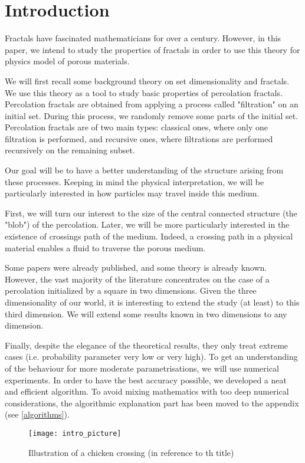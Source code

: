 \setcounter{section}{-1}
\section{Introduction}

Fractals have fascinated mathematicians for over a century.
However, in this paper, we intend to study the properties of fractals in order to use this theory for physics model of porous materials.

We will first recall some background theory on set dimensionality and fractals.
We use this theory as a tool to study basic properties of percolation fractals.
Percolation fractals are obtained from applying a process called "filtration" on an initial set.
During this process, we randomly remove some parts of the initial set.
Percolation fractals are of two main types: classical ones, where only one filtration is performed, and recursive ones, where filtrations are performed recursively on the remaining subset.

Our goal will be to have a better understanding of the structure arising from these processes.
Keeping in mind the physical interpretation, we will be particularly interested in how particles may travel inside this medium.

First, we will turn our interest to the size of the central connected structure (the "blob") of the percolation.
Later, we will be more particularly interested in the existence of crossings path of the medium.
Indeed, a crossing path in a physical material enables a fluid to traverse the porous medium.

Some papers were already published, and some theory is already known.
However, the vast majority of the literature concentrates on the case of a percolation initialized by a square in two dimensions.
Given the three dimensionality of our world, it is interesting to extend the study (at least) to this third dimension.
We will extend some results known in two dimensions to any dimension.

Finally, despite the elegance of the theoretical results, they only treat extreme cases (i.e. probability parameter very low or very high).
To get an understanding of the behaviour for more moderate parametrisations, we will use numerical experiments.
In order to have the best accuracy possible, we developed a neat and efficient algorithm.
To avoid mixing mathematics with too deep numerical considerations, the algorithmic explanation part has been moved to the appendix (see \ref{algorithms}).

\begin{figure}[!h]
	\vspace{2cm}
	\texttt{[image: intro\_picture]}
	\centering
	\caption{Illustration of a chicken crossing (in reference to th title)}
	\label{fig:introRecursivePercolation}
\end{figure}
